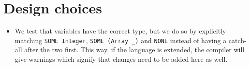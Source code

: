 \section{Design choices}

\begin{itemize}
  \item We test that variables have the correct type, but we do so by
  explicitly matching \verb+SOME Integer+, \verb+SOME (Array _)+ and
  \verb+NONE+ instead of having a catch-all after the two first. This way, if
  the language is extended, the compiler will give warnings which signify that
  changes need to be added here as well.
\end{itemize}
